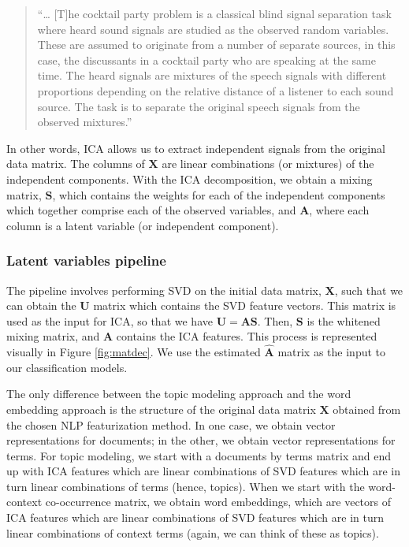 \documentclass{article}
\begin{document}
\begin{quote}
``\ldots{} {[}T{]}he cocktail party problem is a classical blind signal
separation task where heard sound signals are studied as the observed
random variables. These are assumed to originate from a number of
separate sources, in this case, the discussants in a cocktail party who
are speaking at the same time. The heard signals are mixtures of the
speech signals with different proportions depending on the relative
distance of a listener to each sound source. The task is to separate the
original speech signals from the observed mixtures.''
\end{quote}

In other words, ICA allows us to extract independent signals from the
original data matrix. The columns of \(\mathbf{X}\) are linear
combinations (or mixtures) of the independent components. With the ICA
decomposition, we obtain a mixing matrix, \(\mathbf{S}\), which contains
the weights for each of the independent components which together
comprise each of the observed variables, and \(\mathbf{A}\), where each
column is a latent variable (or independent component).

\hypertarget{latent-variables-pipeline}{%
\subsubsection{Latent variables
pipeline}\label{latent-variables-pipeline}}

The pipeline involves performing SVD on the initial data matrix,
\(\mathbf{X}\), such that we can obtain the \(\mathbf{U}\) matrix which
contains the SVD feature vectors. This matrix is used as the input for
ICA, so that we have \(\mathbf{U = AS}\). Then, \(\mathbf{S}\) is the
whitened mixing matrix, and \(\mathbf{A}\) contains the ICA features.
This process is represented visually in Figure \ref{fig:matdec}. We use
the estimated \(\mathbf{\hat{A}}\) matrix as the input to our
classification models.

The only difference between the topic modeling approach and the word
embedding approach is the structure of the original data matrix
\(\mathbf{X}\) obtained from the chosen NLP featurization method. In one
case, we obtain vector representations for documents; in the other, we
obtain vector representations for terms. For topic modeling, we start
with a documents by terms matrix and end up with ICA features which are
linear combinations of SVD features which are in turn linear
combinations of terms (hence, topics). When we start with the
word-context co-occurrence matrix, we obtain word embeddings, which are
vectors of ICA features which are linear combinations of SVD features
which are in turn linear combinations of context terms (again, we can
think of these as topics).
\end{document}
